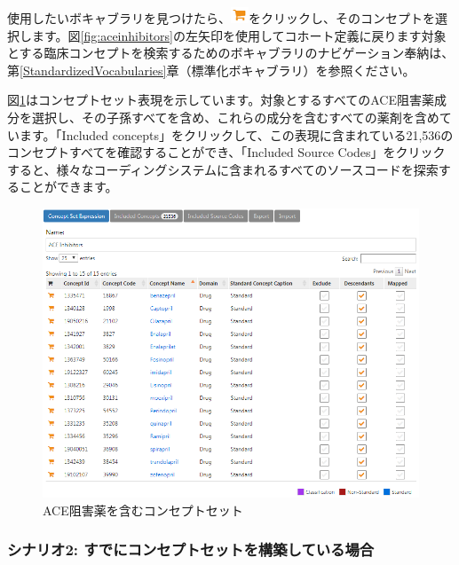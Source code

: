 \documentclass[
  11pt]{book}
\theoremstyle{definition}
\theoremstyle{definition}
\theoremstyle{definition}
\theoremstyle{definition}
\theoremstyle{remark}
\begin{document}
使用したいボキャブラリを見つけたら、\includegraphics{images/Cohorts/shoppingcart.png}をクリックし、そのコンセプトを選択します。図\ref{fig:aceinhibitors}の左矢印を使用してコホート定義に戻ります対象とする臨床コンセプトを検索するためのボキャブラリのナビゲーション奉納は、第\ref{StandardizedVocabularies}章（標準化ボキャブラリ）を参照ください。

図\ref{fig:aceConceptSetExpression}はコンセプトセット表現を示しています。対象とするすべてのACE阻害薬成分を選択し、その子孫すべてを含め、これらの成分を含むすべての薬剤を含めています。「Included concepts」をクリックして、この表現に含まれている21,536のコンセプトすべてを確認することができ、「Included Source Codes」をクリックすると、様々なコーディングシステムに含まれるすべてのソースコードを探索することができます。

\begin{figure}

{\centering \includegraphics[width=1\linewidth]{images/Cohorts/aceConceptSetExpression} 

}

\caption{ACE阻害薬を含むコンセプトセット}\label{fig:aceConceptSetExpression}
\end{figure}

\subsubsection*{シナリオ2: すでにコンセプトセットを構築している場合}\label{ux30b7ux30caux30eaux30aa2-ux3059ux3067ux306bux30b3ux30f3ux30bbux30d7ux30c8ux30bbux30c3ux30c8ux3092ux69cbux7bc9ux3057ux3066ux3044ux308bux5834ux5408}
\end{document}

